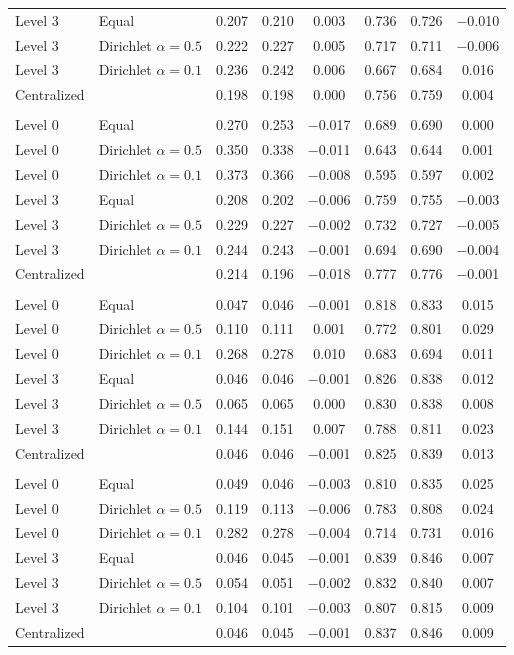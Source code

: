 \begin{tabular}{llcccccc}
Level 3 & Equal & 0.207 & 0.210 & 0.003 & 0.736 & 0.726 & $-$0.010 \\
Level 3 & Dirichlet $\alpha=0.5$ & 0.222 & 0.227 & 0.005 & 0.717 & 0.711 & $-$0.006 \\
Level 3 & Dirichlet $\alpha=0.1$ & 0.236 & 0.242 & 0.006 & 0.667 & 0.684 & 0.016 \\
Centralized &  & 0.198 & 0.198 & 0.000 & 0.756 & 0.759 & 0.004 \\
\addlinespace
\multicolumn{8}{@{}l}{\textit{Diabetic, XGBoost}} \\
Level 0 & Equal & 0.270 & 0.253 & $-$0.017 & 0.689 & 0.690 & 0.000 \\
Level 0 & Dirichlet $\alpha=0.5$ & 0.350 & 0.338 & $-$0.011 & 0.643 & 0.644 & 0.001 \\
Level 0 & Dirichlet $\alpha=0.1$ & 0.373 & 0.366 & $-$0.008 & 0.595 & 0.597 & 0.002 \\
Level 3 & Equal & 0.208 & 0.202 & $-$0.006 & 0.759 & 0.755 & $-$0.003 \\
Level 3 & Dirichlet $\alpha=0.5$ & 0.229 & 0.227 & $-$0.002 & 0.732 & 0.727 & $-$0.005 \\
Level 3 & Dirichlet $\alpha=0.1$ & 0.244 & 0.243 & $-$0.001 & 0.694 & 0.690 & $-$0.004 \\
Centralized &  & 0.214 & 0.196 & $-$0.018 & 0.777 & 0.776 & $-$0.001 \\
\addlinespace
\multicolumn{8}{@{}l}{\textit{Heart, Random Forest}} \\
Level 0 & Equal & 0.047 & 0.046 & $-$0.001 & 0.818 & 0.833 & 0.015 \\
Level 0 & Dirichlet $\alpha=0.5$ & 0.110 & 0.111 & 0.001 & 0.772 & 0.801 & 0.029 \\
Level 0 & Dirichlet $\alpha=0.1$ & 0.268 & 0.278 & 0.010 & 0.683 & 0.694 & 0.011 \\
Level 3 & Equal & 0.046 & 0.046 & $-$0.001 & 0.826 & 0.838 & 0.012 \\
Level 3 & Dirichlet $\alpha=0.5$ & 0.065 & 0.065 & 0.000 & 0.830 & 0.838 & 0.008 \\
Level 3 & Dirichlet $\alpha=0.1$ & 0.144 & 0.151 & 0.007 & 0.788 & 0.811 & 0.023 \\
Centralized &  & 0.046 & 0.046 & $-$0.001 & 0.825 & 0.839 & 0.013 \\
\addlinespace
\multicolumn{8}{@{}l}{\textit{Heart, XGBoost}} \\
Level 0 & Equal & 0.049 & 0.046 & $-$0.003 & 0.810 & 0.835 & 0.025 \\
Level 0 & Dirichlet $\alpha=0.5$ & 0.119 & 0.113 & $-$0.006 & 0.783 & 0.808 & 0.024 \\
Level 0 & Dirichlet $\alpha=0.1$ & 0.282 & 0.278 & $-$0.004 & 0.714 & 0.731 & 0.016 \\
Level 3 & Equal & 0.046 & 0.045 & $-$0.001 & 0.839 & 0.846 & 0.007 \\
Level 3 & Dirichlet $\alpha=0.5$ & 0.054 & 0.051 & $-$0.002 & 0.832 & 0.840 & 0.007 \\
Level 3 & Dirichlet $\alpha=0.1$ & 0.104 & 0.101 & $-$0.003 & 0.807 & 0.815 & 0.009 \\
Centralized &  & 0.046 & 0.045 & $-$0.001 & 0.837 & 0.846 & 0.009 \\
\bottomrule
\end{tabular}
